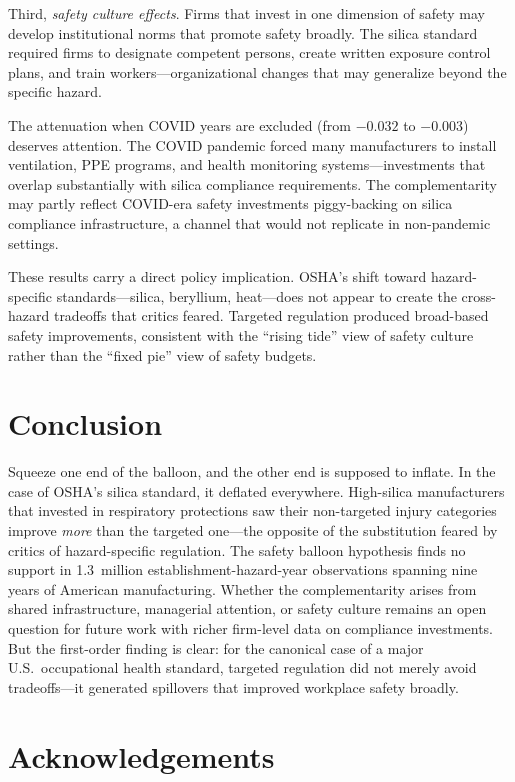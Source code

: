 \documentclass[12pt]{article}
\begin{document}
Third, \textit{safety culture effects}. Firms that invest in one dimension of safety may develop institutional norms that promote safety broadly. The silica standard required firms to designate competent persons, create written exposure control plans, and train workers---organizational changes that may generalize beyond the specific hazard.

The attenuation when COVID years are excluded (from $-0.032$ to $-0.003$) deserves attention. The COVID pandemic forced many manufacturers to install ventilation, PPE programs, and health monitoring systems---investments that overlap substantially with silica compliance requirements. The complementarity may partly reflect COVID-era safety investments piggy-backing on silica compliance infrastructure, a channel that would not replicate in non-pandemic settings.

These results carry a direct policy implication. OSHA's shift toward hazard-specific standards---silica, beryllium, heat---does not appear to create the cross-hazard tradeoffs that critics feared. Targeted regulation produced broad-based safety improvements, consistent with the ``rising tide'' view of safety culture rather than the ``fixed pie'' view of safety budgets.


\section{Conclusion}
\label{sec:conclusion}

Squeeze one end of the balloon, and the other end is supposed to inflate. In the case of OSHA's silica standard, it deflated everywhere. High-silica manufacturers that invested in respiratory protections saw their non-targeted injury categories improve \textit{more} than the targeted one---the opposite of the substitution feared by critics of hazard-specific regulation. The safety balloon hypothesis finds no support in 1.3~million establishment-hazard-year observations spanning nine years of American manufacturing. Whether the complementarity arises from shared infrastructure, managerial attention, or safety culture remains an open question for future work with richer firm-level data on compliance investments. But the first-order finding is clear: for the canonical case of a major U.S.\ occupational health standard, targeted regulation did not merely avoid tradeoffs---it generated spillovers that improved workplace safety broadly.


\section*{Acknowledgements}
\end{document}
